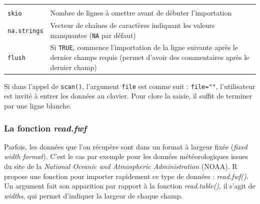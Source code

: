 \documentclass[
  11pt,
]{book}
\numberwithin{equation}{section}
\newcounter{countremarque}
\newenvironment{remarque}{%
 \refstepcounter{countremarque}
    \begin{tcolorbox}[width=\linewidth, colback=blue!3, boxrule=0.5pt,arc=0pt,title = Remarque \thecountremarque]
    }%
    {
    \end{tcolorbox}
    }
\numberwithin{countremarque}{section}
\begin{document}
\begin{longtable}[]{@{}ll@{}}
\begin{minipage}[t]{0.51\columnwidth}
\end{minipage}\tabularnewline
\begin{minipage}[t]{0.43\columnwidth}\raggedright
\texttt{skio}\strut
\end{minipage} & \begin{minipage}[t]{0.51\columnwidth}\raggedright
Nombre de lignes à omettre avant de débuter l'importation\strut
\end{minipage}\tabularnewline
\begin{minipage}[t]{0.43\columnwidth}\raggedright
\texttt{na.strings}\strut
\end{minipage} & \begin{minipage}[t]{0.51\columnwidth}\raggedright
Vecteur de chaînes de caractères indiquant les valeurs manquantes (\texttt{NA} par défaut)\strut
\end{minipage}\tabularnewline
\begin{minipage}[t]{0.43\columnwidth}\raggedright
\texttt{flush}\strut
\end{minipage} & \begin{minipage}[t]{0.51\columnwidth}\raggedright
Si \texttt{TRUE}, commence l'importation de la ligne suivante après le dernier champs requis (permet d'avoir des commentaires après le dernier champ)\strut
\end{minipage}\tabularnewline
\bottomrule
\end{longtable}

\begin{remarque}
Si dans l'appel de \texttt{scan()}, l'argument \texttt{file} est comme suit : \texttt{file=""}, l'utilisateur est invité à entrer les données au clavier. Pour clore la saisie, il suffit de terminer par une ligne blanche.
\end{remarque}

\hypertarget{la-fonction-read.fwf}{%
\subsubsection{\texorpdfstring{La fonction \emph{read.fwf}}{La fonction read.fwf}}\label{la-fonction-read.fwf}}

Parfois, les données que l'on récupère sont dans un format à largeur fixée (\emph{fixed width format}). C'est le cas par exemple pour les données météorologiques issues du site de la \emph{National Oceanic and Atmospheric Administration} (NOAA). R propose une fonction pour importer rapidement ce type de données : \emph{read.fwf()}. Un argument fait son apparition par rapport à la fonction \emph{read.table()}, il s'agit de \emph{widths}, qui permet d'indiquer la largeur de chaque champ.
\end{document}
